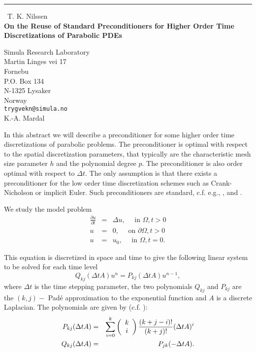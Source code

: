 \documentclass{report}
\begin{document}
\begin{center}
\rule{6in}{1pt} \
{\large T. K. Nilssen \\
{\bf On the Reuse of Standard Preconditioners for Higher Order Time Discretizations of Parabolic PDEs}}

Simula Research Laboratory \\ Martin Linges vei 17 \\ Fornebu \\ P.O. Box 134 \\ N-1325 Lysaker \\ Norway
\\
{\tt trygvekn@simula.no}\\
K.-A. Mardal\end{center}

\newtheorem{lemma}{Lemma}

In this abstract we will describe a preconditioner for some higher order
time discretizations of parabolic problems.
The preconditioner is optimal with respect to the spatial
discretization parameters, that typically are the characteristic mesh
size parameter $h$ and the polynomial degree $p$.
The preconditioner is also order optimal with respect to $\Delta t$. The
only assumption is that there exists a preconditioner for the low order
time discretization schemes such as Crank-Nicholson or implicit Euler.
Such preconditioners are standard, c.f. e.g., \cite{BD},
\cite{olshanskii00convergence} and \cite{Thomee}.

We study the model problem
\begin{eqnarray*}
\frac{\partial u}{\partial t} &=& \Delta u, \quad \mbox{ in } \Omega, t > 0 \\
u &=& 0, \quad \mbox{ on } \partial \Omega, t>0 \\
u &=& u_0, \quad \mbox{ in } \Omega, t=0.
\end{eqnarray*}

This equation is discretized in space and time to give the
following linear system to be solved for each time level
\begin{equation*}
Q_{kj} (\Delta t A) u^n = P_{kj} (\Delta t A) u^{n-1},
\end{equation*}
where $\Delta t $ is the time stepping parameter, the two polynomials
$Q_{kj}$ and $P_{kj}$ are the $(k,j)-$ Pad\'{e} approximation to the
exponential function and $A$ is a discrete Laplacian.
The polynomials are given by (c.f. \cite{Thomee}):
\begin{eqnarray*}
P_{kj}(\Delta t A )&=&
\sum_{i=0}^k \left( \begin{array}{c c}
k \\
i
\end{array} \right) \frac {(k+j-i)!}{(k+j)!} (\Delta t A)^i \\
Q_{kj}(\Delta t A )&=&P_{jk}(-\Delta t A ).
\end{eqnarray*}
\end{document}
